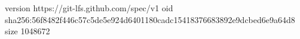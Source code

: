 version https://git-lfs.github.com/spec/v1
oid sha256:56f8482f446c57c5de5e924d6401180cadc15418376683892e9dcbed6e9a64d8
size 1048672
